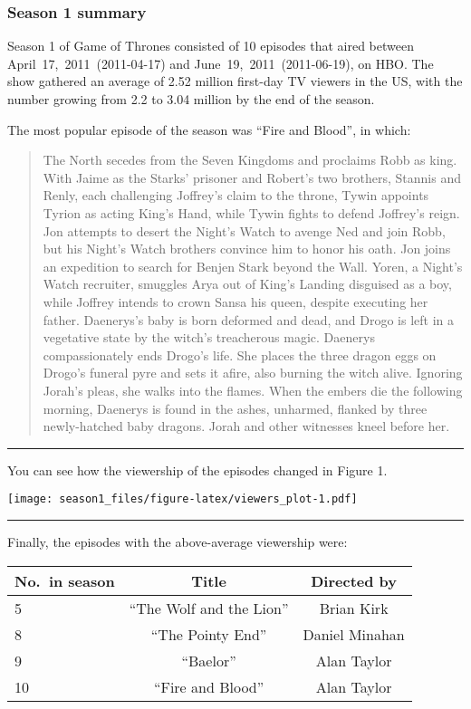 \documentclass[
]{article}
\begin{document}
\hypertarget{season-1-summary}{%
\subsubsection{Season 1 summary}\label{season-1-summary}}

Season 1 of Game of Thrones consisted of 10 episodes that aired between
April~17,~2011~(2011-04-17) and June~19,~2011~(2011-06-19), on HBO. The
show gathered an average of 2.52 million first-day TV viewers in the US,
with the number growing from 2.2 to 3.04 million by the end of the
season.

The most popular episode of the season was ``Fire and Blood'', in which:

\begin{quote}
The North secedes from the Seven Kingdoms and proclaims Robb as king.
With Jaime as the Starks' prisoner and Robert's two brothers, Stannis
and Renly, each challenging Joffrey's claim to the throne, Tywin
appoints Tyrion as acting King's Hand, while Tywin fights to defend
Joffrey's reign. Jon attempts to desert the Night's Watch to avenge Ned
and join Robb, but his Night's Watch brothers convince him to honor his
oath. Jon joins an expedition to search for Benjen Stark beyond the
Wall. Yoren, a Night's Watch recruiter, smuggles Arya out of King's
Landing disguised as a boy, while Joffrey intends to crown Sansa his
queen, despite executing her father. Daenerys's baby is born deformed
and dead, and Drogo is left in a vegetative state by the witch's
treacherous magic. Daenerys compassionately ends Drogo's life. She
places the three dragon eggs on Drogo's funeral pyre and sets it afire,
also burning the witch alive. Ignoring Jorah's pleas, she walks into the
flames. When the embers die the following morning, Daenerys is found in
the ashes, unharmed, flanked by three newly-hatched baby dragons. Jorah
and other witnesses kneel before her.
\end{quote}

\begin{center}\rule{0.5\linewidth}{0.5pt}\end{center}

You can see how the viewership of the episodes changed in Figure 1.

\texttt{[image: season1\_files/figure-latex/viewers\_plot-1.pdf]}

\begin{center}\rule{0.5\linewidth}{0.5pt}\end{center}

Finally, the episodes with the above-average viewership were:

\begin{longtable}[]{@{}lcc@{}}
\toprule
No.~in season & Title & Directed by \\
\midrule
\endhead
5 & ``The Wolf and the Lion'' & Brian Kirk \\
8 & ``The Pointy End'' & Daniel Minahan \\
9 & ``Baelor'' & Alan Taylor \\
10 & ``Fire and Blood'' & Alan Taylor \\
\bottomrule
\end{longtable}
\end{document}
